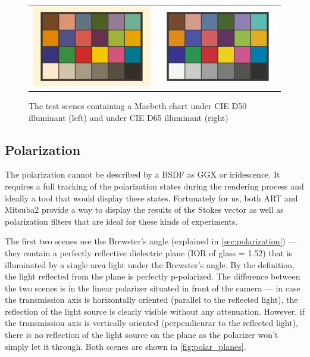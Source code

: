 \begin{figure}[h]
	\begin{tabular}{cc}
		\includegraphics[width=.45\linewidth]{img/macbeth_chart_D50.png}
		&
		\includegraphics[width=.45\linewidth]{img/macbeth_chart_D65.png}
	\end{tabular}
	\caption{The test scenes containing a Macbeth chart under CIE D50 illuminant (left) and under CIE D65 illuminant (right)}
	\label{fig:macbeth}
\end{figure}

\subsection{Polarization}

The polarization cannot be described by a BSDF as GGX or iridescence. It requires a full tracking of the polarization states during the rendering process and ideally a tool that would display these states. Fortunately for us, both ART and Mitsuba2 provide a way to display the results of the Stokes vector as well as polarization filters that are ideal for these kinds of experiments.

The first two scenes use the Brewster's angle (explained in \autoref{sec:polarization}) --- they contain a perfectly reflective dielectric plane (IOR of glass = 1.52) that is illuminated by a single area light under the Brewster's angle. By the definition, the light reflected from the plane is perfectly p-polarized. The difference between the two scenes is in the linear polarizer situated in front of the camera --- in case the transmission axis is horizontally oriented (parallel to the reflected light), the reflection of the light source is clearly visible without any attenuation. However, if the transmission axis is vertically oriented (perpendicurar to the reflected light), there is no reflection of the light source on the plane as the polarizer won't simply let it through. Both scenes are shown in \autoref{fig:polar_planes}.

